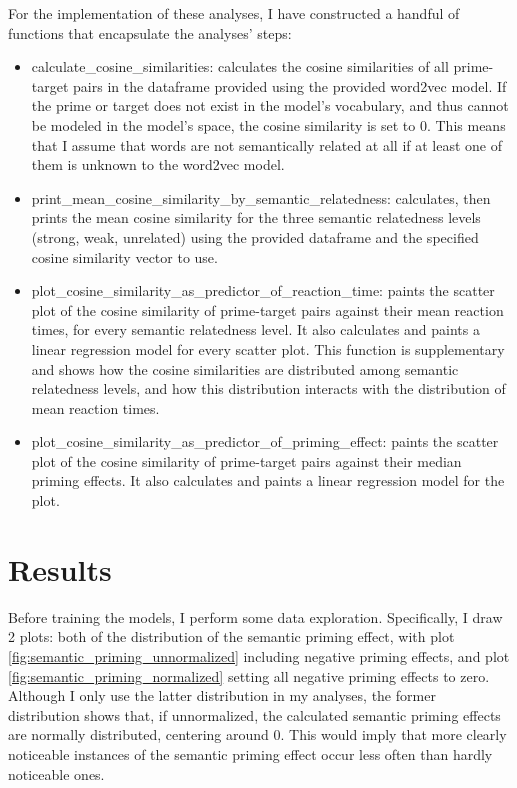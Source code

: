 \documentclass{IEEEtran}
\begin{document}
For the implementation of these analyses, I have constructed a handful of functions that encapsulate the analyses' steps:
\begin{itemize}
    \item calculate\_cosine\_similarities: calculates the cosine similarities of all prime-target pairs in the dataframe provided using the provided word2vec model.
    If the prime or target does not exist in the model's vocabulary, and thus cannot be modeled in the model's space, the cosine similarity is set to 0.
    This means that I assume that words are not semantically related at all if at least one of them is unknown to the word2vec model.
    \item print\_mean\_cosine\_similarity\_by\_semantic\_relatedness: calculates, then prints the mean cosine similarity for the three semantic relatedness levels (strong, weak, unrelated) using the provided dataframe and the specified cosine similarity vector to use.
    \item plot\_cosine\_similarity\_as\_predictor\_of\_reaction\_time: paints the scatter plot of the cosine similarity of prime-target pairs against their mean reaction times, for every semantic relatedness level.
    It also calculates and paints a linear regression model for every scatter plot.
    This function is supplementary and shows how the cosine similarities are distributed among semantic relatedness levels, and how this distribution interacts with the distribution of mean reaction times.
    \item plot\_cosine\_similarity\_as\_predictor\_of\_priming\_effect: paints the scatter plot of the cosine similarity of prime-target pairs against their median priming effects.
    It also calculates and paints a linear regression model for the plot.
\end{itemize}

\section{Results}
Before training the models, I perform some data exploration. 
Specifically, I draw 2 plots: both of the distribution of the semantic priming effect, with plot \ref{fig:semantic_priming_unnormalized} including negative priming effects, and plot \ref{fig:semantic_priming_normalized} setting all negative priming effects to zero.
Although I only use the latter distribution in my analyses, the former distribution shows that, if unnormalized, the calculated semantic priming effects are normally distributed, centering around 0.
This would imply that more clearly noticeable instances of the semantic priming effect occur less often than hardly noticeable ones.
\end{document}
